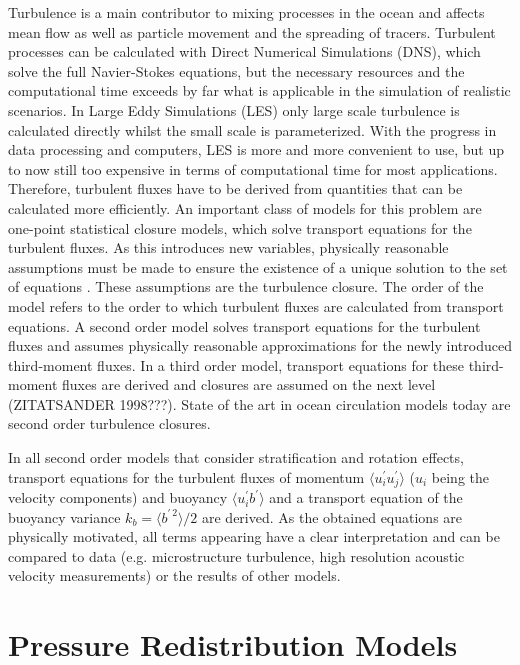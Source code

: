 Turbulence is a main contributor to mixing processes in the ocean and affects mean flow as well as particle movement and the spreading of tracers. Turbulent processes can be calculated with Direct Numerical Simulations (DNS), which solve the full Navier-Stokes equations, but the necessary resources and the computational time exceeds by far what is applicable in the simulation of realistic scenarios. In Large Eddy Simulations (LES) only large scale turbulence is calculated directly whilst the small scale is parameterized. With the progress in data processing and computers, LES is more and more convenient to use, but up to now still too expensive in terms of computational time for most applications. Therefore, turbulent fluxes have to be derived from quantities that can be calculated more efficiently. An important class of models for this problem are one-point statistical closure models, which solve transport equations for the turbulent fluxes. As this introduces new variables, physically reasonable assumptions must be made to ensure the existence of a unique solution to the set of equations \citep[][]{UmlaufBurchard2005a}. These assumptions are the turbulence closure. The order of the model refers to the order to which turbulent fluxes are calculated from transport equations. A second order model solves transport equations for the turbulent fluxes and assumes physically reasonable approximations for the newly introduced third-moment fluxes. In a third order model, transport equations for these third-moment fluxes are derived and closures are assumed on the next level (ZITATSANDER 1998???). State of the art in ocean circulation models today are second order turbulence closures.

In all second order models that consider stratification and rotation effects, transport equations for the turbulent fluxes of momentum $\langle u_i^\prime u_j^\prime \rangle$ ($u_i$ being the velocity components) and buoyancy $\langle u_i^\prime b^\prime \rangle$ and a transport equation of the buoyancy variance $k_b = \langle b^{\prime \, 2} \rangle \slash 2 $ are derived. As the obtained equations are physically motivated, all terms appearing have a clear interpretation and can be compared to data (e.g. microstructure turbulence, high resolution acoustic velocity measurements) or the results of other models. 

\section{Pressure Redistribution Models}

